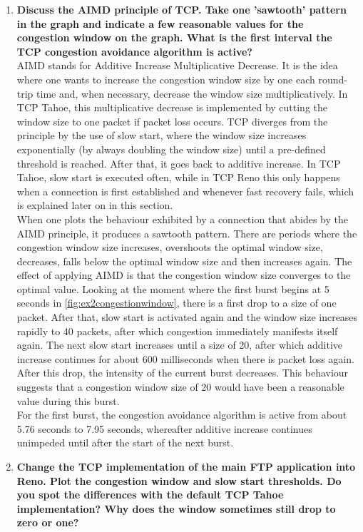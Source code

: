 \documentclass[a4paper,10pt]{article}
\begin{document}
\begin{enumerate}
 \item \textbf{Discuss the AIMD principle of TCP. Take one 'sawtooth' pattern in the graph and indicate a few
 reasonable values for the congestion window on the graph. What is the first interval the TCP congestion avoidance
 algorithm is active?} \\
 
 AIMD stands for Additive Increase Multiplicative Decrease. It is the idea where one wants to increase the congestion window
 size by one each round-trip time and, when necessary, decrease the window size multiplicatively. In TCP Tahoe, this
 multiplicative decrease is implemented by cutting the window size to one packet if packet loss occurs. TCP diverges
 from the principle by the use of slow start, where the window size increases exponentially (by always doubling the
 window size) until a pre-defined threshold is reached. After that, it goes back to additive increase. In TCP Tahoe,
 slow start is executed often, while in TCP Reno this only happens when a connection is first established and
 whenever fast recovery fails, which is explained later on in this section. \\
 
 When one plots the behaviour exhibited by a connection that abides by the AIMD principle, it produces a sawtooth pattern.
 There are periods where the congestion window size increases, overshoots the optimal window size, decreases, falls
 below the optimal window size and then increases again. The effect of applying AIMD
 is that the congestion window size converges to the optimal value. Looking at the moment where the first burst begins at 5 seconds in \ref{fig:ex2congestionwindow},
 there is a first drop to a size of one packet. After that, slow start is activated again and the window size increases
 rapidly to 40 packets, after which congestion immediately manifests itself again. The next slow start increases until
 a size of 20, after which additive increase continues for about 600 milliseconds when there is packet loss again.
 After this drop, the intensity of the current burst decreases. This behaviour suggests that a congestion window size
 of 20 would have been a reasonable value during this burst. \\
 
 For the first burst, the congestion avoidance algorithm is active from about 5.76 seconds to 7.95 seconds, whereafter
 additive increase continues unimpeded until after the start of the next burst.
 
 \item \textbf{Change the TCP implementation of the main FTP application into Reno. Plot the congestion window
 and slow start thresholds. Do you spot the differences with the default TCP Tahoe implementation? Why does the
 window sometimes still drop to zero or one?} \\
 

\end{enumerate}
\end{document}

